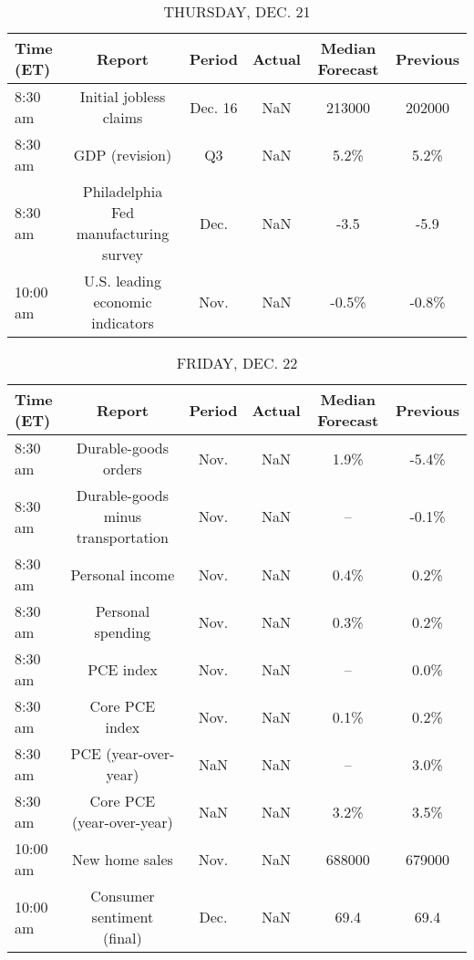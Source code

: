 \documentclass{article}%
\begin{document}
\begin{table}[htbp]%
\caption{THURSDAY, DEC. 21}%
\centering%
\begin{adjustbox}{width=1\textwidth}%
\begin{tabular}{lccccc}
\toprule
Time (ET) &                                Report &  Period & Actual & Median Forecast & Previous \\
\midrule
  8:30 am &                Initial jobless claims & Dec. 16 &    NaN &          213000 &   202000 \\
  8:30 am &                        GDP (revision) &      Q3 &    NaN &            5.2\% &     5.2\% \\
  8:30 am & Philadelphia Fed manufacturing survey &    Dec. &    NaN &            -3.5 &     -5.9 \\
 10:00 am &      U.S. leading economic indicators &    Nov. &    NaN &           -0.5\% &    -0.8\% \\
\bottomrule
\end{tabular}
%
\end{adjustbox}%
\end{table}

%


\begin{table}[htbp]%
\caption{FRIDAY, DEC. 22}%
\centering%
\begin{adjustbox}{width=1\textwidth}%
\begin{tabular}{lccccc}
\toprule
Time (ET) &                             Report & Period & Actual & Median Forecast & Previous \\
\midrule
  8:30 am &               Durable-goods orders &   Nov. &    NaN &            1.9\% &    -5.4\% \\
  8:30 am & Durable-goods minus transportation &   Nov. &    NaN &              -- &    -0.1\% \\
  8:30 am &                    Personal income &   Nov. &    NaN &            0.4\% &     0.2\% \\
  8:30 am &                  Personal spending &   Nov. &    NaN &            0.3\% &     0.2\% \\
  8:30 am &                          PCE index &   Nov. &    NaN &              -- &     0.0\% \\
  8:30 am &                     Core PCE index &   Nov. &    NaN &            0.1\% &     0.2\% \\
  8:30 am &               PCE (year-over-year) &    NaN &    NaN &              -- &     3.0\% \\
  8:30 am &          Core PCE (year-over-year) &    NaN &    NaN &            3.2\% &     3.5\% \\
 10:00 am &                     New home sales &   Nov. &    NaN &          688000 &   679000 \\
 10:00 am &         Consumer sentiment (final) &   Dec. &    NaN &            69.4 &     69.4 \\
\bottomrule
\end{tabular}
%
\end{adjustbox}%
\end{table}
\end{document}
